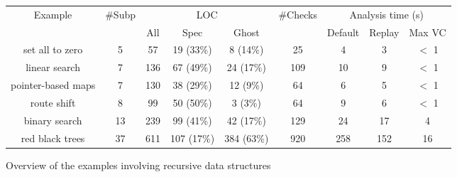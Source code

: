 \documentclass[runningheads]{llncs}
\begin{document}
\begin{figure}
\vspace{-5mm}
\setlength{\tabcolsep}{3pt}
\renewcommand{\arraystretch}{1.5}
\begin{center}
\scriptsize
\begin{tabular}{ c c ccc c ccc }
 \hline
\multirow{2}{*}{Example} &
\multirow{2}{*}{\#Subp} &
\multicolumn{3}{c}{LOC}&
\multirow{2}{*}{\#Checks} &
\multicolumn{3}{c}{Analysis time (s)}\\
& & All & Spec & Ghost & &
Default & Replay & Max VC\\
\hline
set all to zero
& 5
& 57
& 19 (33\%)
& 8 (14\%)
& 25
& 4
& 3
& $<$ 1\\
linear search
& 7
& 136
& 67 (49\%)
& 24 (17\%)
& 109
& 10
& 9
& $<$ 1\\
pointer-based maps
& 7
& 130
& 38 (29\%)
& 12 (9\%)
& 64
& 6
& 5
& $<$ 1\\
route shift
& 8
& 99
& 50 (50\%)
& 3 (3\%)
& 64
& 9
& 6
& $<$ 1\\
binary search
& 13
& 239
& 99 (41\%)
& 42 (17\%)
& 129
& 24
& 17
& 4\\
red black trees
& 37
& 611
& 107 (17\%)
& 384 (63\%)
& 920
& 258
& 152
& 16\\
\hline
\end{tabular}
\end{center}
\caption {\label{table-examples}Overview of the examples involving recursive data structures}
\vspace{-5mm}
\end{figure}
\end{document}
